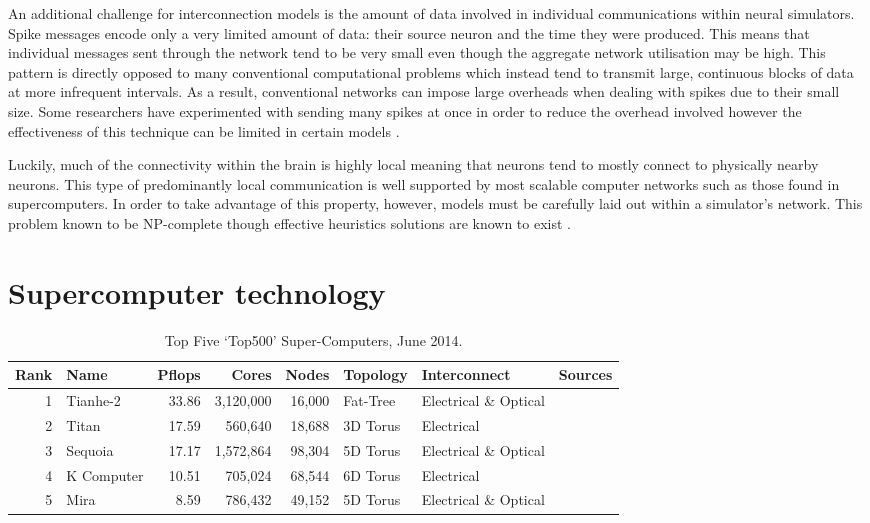 			An additional challenge for interconnection models is the amount of data
			involved in individual communications within neural simulators. Spike
			messages encode only a very limited amount of data: their source neuron
			and the time they were produced. This means that individual messages sent
			through the network tend to be very small even though the aggregate
			network utilisation may be high. This pattern is directly opposed to many
			conventional computational problems which instead tend to transmit large,
			continuous blocks of data at more infrequent intervals. As a result,
			conventional networks can impose large overheads when dealing with spikes
			due to their small size. Some researchers have experimented with sending
			many spikes at once in order to reduce the overhead involved however the
			effectiveness of this technique can be limited in certain models
			\cite{morrison05}.
			
			Luckily, much of the connectivity within the brain is highly local meaning
			that neurons tend to mostly connect to physically nearby neurons. This
			type of predominantly local communication is well supported by most
			scalable computer networks such as those found in supercomputers. In order
			to take advantage of this property, however, models must be carefully laid
			out within a simulator's network. This problem known to be NP-complete
			though effective heuristics solutions are known to exist \cite{haldar00}.
		
		
	
	\section{Supercomputer technology}
		\label{sec:supercomputers}
		
		\begin{table}
			\center
			\begin{tabular}{r l r r r l l l}
				\toprule
				Rank & Name    & Pflops& Cores  & Nodes  & Topology & Interconnect          & Sources \\
				\midrule                          
				1 & Tianhe-2   & 33.86 & 3,120,000 & 16,000 & Fat-Tree & Electrical \& Optical & \cite{dongarra13} \\
				2 & Titan      & 17.59 & 560,640   & 18,688 & 3D Torus & Electrical            & \cite{bland12} \\
				3 & Sequoia    & 17.17 & 1,572,864 & 98,304 & 5D Torus & Electrical \& Optical & \cite{prickett10} \\
				4 & K Computer & 10.51 & 705,024   & 68,544 & 6D Torus & Electrical            & \cite{fujitsu11,yokokawa11} \\
				5 & Mira       &  8.59 & 786,432   & 49,152 & 5D Torus & Electrical \& Optical & \cite{prickett10} \\
				\bottomrule
			\end{tabular}
			
			\caption{Top Five `Top500' Super-Computers, June 2014.}
			\label{tab:top500}
		\end{table}
		
